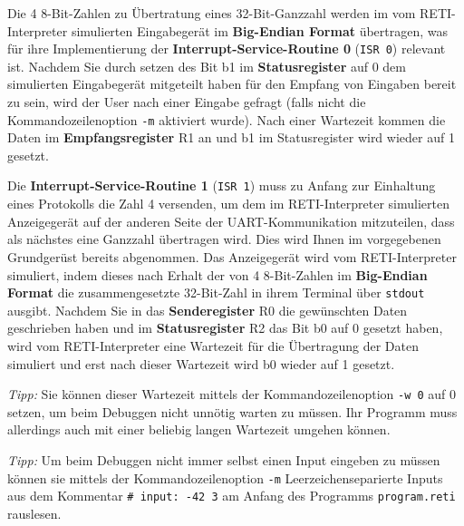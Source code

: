 \documentclass{article}
\begin{document}
{\color{green}
  Die 4 8-Bit-Zahlen zu Übertratung eines 32-Bit-Ganzzahl werden im vom RETI-Interpreter simulierten Eingabegerät im \textbf{Big-Endian Format} übertragen, was für ihre Implementierung der \textbf{Interrupt-Service-Routine 0} (\texttt{ISR 0}) relevant ist. Nachdem Sie durch setzen des Bit b1 im \textbf{Statusregister} auf 0 dem simulierten Eingabegerät mitgeteilt haben für den Empfang von Eingaben bereit zu sein, wird der User nach einer Eingabe gefragt (falls nicht die Kommandozeilenoption \texttt{-m} aktiviert wurde). Nach einer Wartezeit kommen die Daten im \textbf{Empfangsregister} R1 an und b1 im Statusregister wird wieder auf 1 gesetzt. 

  Die \textbf{Interrupt-Service-Routine 1} (\texttt{ISR 1}) muss zu Anfang zur Einhaltung eines Protokolls die Zahl 4 versenden, um dem im RETI-Interpreter simulierten Anzeigegerät auf der anderen Seite der UART-Kommunikation mitzuteilen, dass als nächstes eine Ganzzahl übertragen wird. Dies wird Ihnen im vorgegebenen Grundgerüst bereits abgenommen. Das Anzeigegerät wird vom RETI-Interpreter simuliert, indem dieses nach Erhalt der von 4 8-Bit-Zahlen im \textbf{Big-Endian Format} die zusammengesetzte 32-Bit-Zahl in ihrem Terminal über \verb|stdout| ausgibt. Nachdem Sie in das \textbf{Senderegister} R0 die gewünschten Daten geschrieben haben und im \textbf{Statusregister} R2 das Bit b0 auf 0 gesetzt haben, wird vom RETI-Interpreter eine Wartezeit für die Übertragung der Daten simuliert und erst nach dieser Wartezeit wird b0 wieder auf 1 gesetzt. 

  \textit{Tipp:} Sie können dieser Wartezeit mittels der Kommandozeilenoption \texttt{-w 0} auf 0 setzen, um beim Debuggen nicht unnötig warten zu müssen. Ihr Programm muss allerdings auch mit einer beliebig langen Wartezeit umgehen können.

  \textit{Tipp:} Um beim Debuggen nicht immer selbst einen Input eingeben zu müssen können sie mittels der Kommandozeilenoption \texttt{-m} Leerzeichenseparierte Inputs aus dem Kommentar \verb|# input: -42 3| am Anfang des Programms \verb|program.reti| rauslesen.


}
\end{document}
